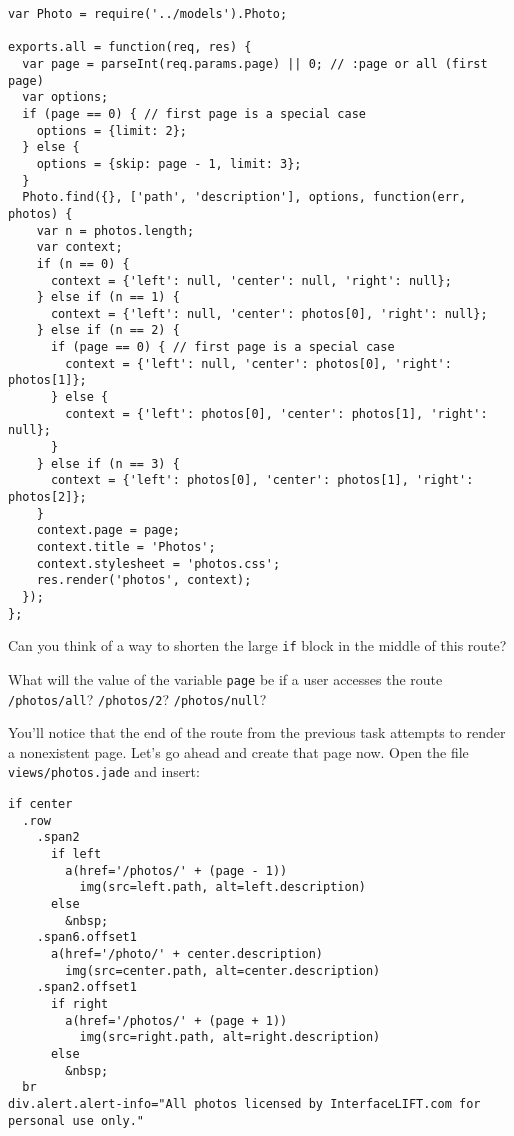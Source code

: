 \documentclass{article}
\begin{document}
\begin{verbatim}
var Photo = require('../models').Photo;

exports.all = function(req, res) {
  var page = parseInt(req.params.page) || 0; // :page or all (first page)
  var options;
  if (page == 0) { // first page is a special case
    options = {limit: 2};
  } else {
    options = {skip: page - 1, limit: 3};
  }
  Photo.find({}, ['path', 'description'], options, function(err, photos) {
    var n = photos.length;
    var context;
    if (n == 0) {
      context = {'left': null, 'center': null, 'right': null};
    } else if (n == 1) {
      context = {'left': null, 'center': photos[0], 'right': null};
    } else if (n == 2) {
      if (page == 0) { // first page is a special case
        context = {'left': null, 'center': photos[0], 'right': photos[1]};
      } else {
        context = {'left': photos[0], 'center': photos[1], 'right': null};
      }
    } else if (n == 3) {
      context = {'left': photos[0], 'center': photos[1], 'right': photos[2]};
    }
    context.page = page;
    context.title = 'Photos';
    context.stylesheet = 'photos.css';
    res.render('photos', context);
  });
};
\end{verbatim}

 Can you think of a way to shorten the large \verb!if! block in the middle of this route?

 What will the value of the variable \verb!page! be if a user accesses the route \verb!/photos/all!? \verb!/photos/2!? \verb!/photos/null!?


You'll notice that the end of the route from the previous task attempts to render a nonexistent page. Let's go ahead and create that page now. Open the file \verb!views/photos.jade! and insert:

\begin{verbatim}
if center
  .row
    .span2
      if left
        a(href='/photos/' + (page - 1))
          img(src=left.path, alt=left.description)
      else
        &nbsp;
    .span6.offset1
      a(href='/photo/' + center.description)
        img(src=center.path, alt=center.description)
    .span2.offset1
      if right
        a(href='/photos/' + (page + 1))
          img(src=right.path, alt=right.description)
      else
        &nbsp;
  br
div.alert.alert-info="All photos licensed by InterfaceLIFT.com for personal use only."
\end{verbatim}
\end{document}
